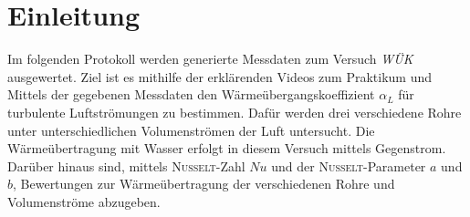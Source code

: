 %
\pagebreak
\section{Einleitung}
\label{sec:einleitung}
Im folgenden Protokoll werden generierte Messdaten zum Versuch \textit{WÜK} ausgewertet. Ziel ist es mithilfe der erklärenden Videos zum Praktikum und Mittels der gegebenen Messdaten den Wärmeübergangskoeffizient $\alpha_L$ für turbulente Luftströmungen zu bestimmen. Dafür werden  drei verschiedene Rohre unter unterschiedlichen Volumenströmen der Luft untersucht. Die Wärmeübertragung mit Wasser erfolgt  in diesem Versuch mittels Gegenstrom.
Darüber hinaus sind, mittels \textsc{Nußelt}-Zahl $Nu$ und der \textsc{Nußelt}-Parameter $a$ und $b$, Bewertungen zur Wärmeübertragung der verschiedenen Rohre und Volumenströme abzugeben.





